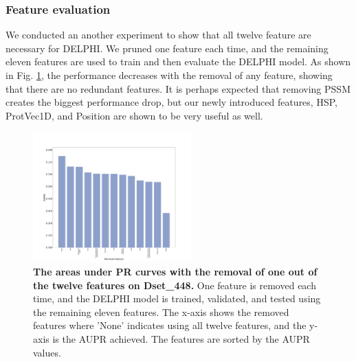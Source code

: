 \documentclass{bioinfo}
\begin{document}
\subsubsection{Feature evaluation}
We conducted an another experiment to show that all twelve feature are necessary for DELPHI. We pruned one feature each time, and the remaining eleven features are used to train and then evaluate the DELPHI model. As shown in Fig. \ref{fig_remove_each_feature}, the performance decreases with the removal of any feature, showing that there are no redundant features. It is perhaps expected that  removing PSSM creates the biggest performance drop, but our newly introduced features, HSP, ProtVec1D, and Position are shown to be  very useful as well. 

\begin{figure}
\centering
\includegraphics[width=\columnwidth, height=5cm]{remove_features_individually_Testing.pdf}
  \caption{\textbf{The areas under PR curves with the removal of one out of the twelve features on Dset\_448.} One feature is removed each time, and the DELPHI model is trained, validated, and tested using the remaining eleven features. The x-axis shows the removed features where 'None' indicates using all twelve features, and the y-axis is the AUPR achieved. The features are sorted by the AUPR values. 
  \label{fig_remove_each_feature}}
\end{figure}
\end{document}
